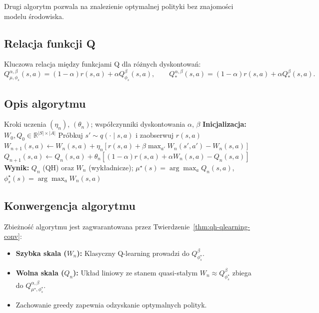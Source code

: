 Drugi algorytm pozwala na znalezienie optymalnej polityki bez znajomości modelu środowiska.

\subsection{Relacja funkcji Q}

Kluczowa relacja między funkcjami Q dla różnych dyskontowań:
\begin{equation}
Q^{\alpha, \beta}_{\mu, \phi_s}(s,a) = (1 - \alpha) r(s,a) + \alpha Q^{\beta}_{\phi_s}(s,a), \qquad Q^{\alpha, \beta}_*(s,a) = (1 - \alpha) r(s,a) + \alpha Q^{\beta}_*(s,a).
\label{eq:q-relation}
\end{equation}

\subsection{Opis algorytmu}

\begin{algorithm}[H]
\caption{QH Q-Learning (Bezmodelowy)}
\label{alg:qh-qlearning}
\begin{algorithmic}[1]
\REQUIRE Kroki uczenia $(\eta_n)$, $(\theta_n)$; współczynniki dyskontowania $\alpha$, $\beta$
\STATE \textbf{Inicjalizacja:} $W_0, Q_0 \in \mathbb{R}^{|S| \times |A|}$
\STATE Próbkuj $s' \sim q(\cdot\mid s, a)$ i zaobserwuj $r(s, a)$
\STATE $W_{n+1}(s, a) \leftarrow W_n(s, a) + \eta_n \left[ r(s, a) + \beta \max_{a'} W_n(s', a') - W_n(s, a) \right]$
\STATE $Q_{n+1}(s, a) \leftarrow Q_n(s, a) + \theta_n \left[ (1 - \alpha) r(s, a) + \alpha W_n(s, a) - Q_n(s, a) \right]$
\ENDFOR
\ENDFOR
\STATE \textbf{Wynik:} $Q_n$ (QH) oraz $W_n$ (wykładnicze); $\mu^\star(s) = \arg\max_a Q_n(s, a)$, $\phi_s^\star(s) = \arg\max_a W_n(s, a)$
\end{algorithmic}
\end{algorithm}

\subsection{Konwergencja algorytmu}

Zbieżność algorytmu jest zagwarantowana przez Twierdzenie~\ref{thm:qh-qlearning-conv}:

\begin{itemize}
\item \textbf{Szybka skala ($W_n$):} Klasyczny Q-learning prowadzi do $Q^{\beta}_{\phi_s^\star}$.
\item \textbf{Wolna skala ($Q_n$):} Układ liniowy ze stanem quasi-stałym $W_n \approx Q^{\beta}_{\phi_s^\star}$ zbiega do $Q^{\alpha, \beta}_{\mu^\star, \phi_s^\star}$.
\item Zachowanie greedy zapewnia odzyskanie optymalnych polityk.
\end{itemize}

